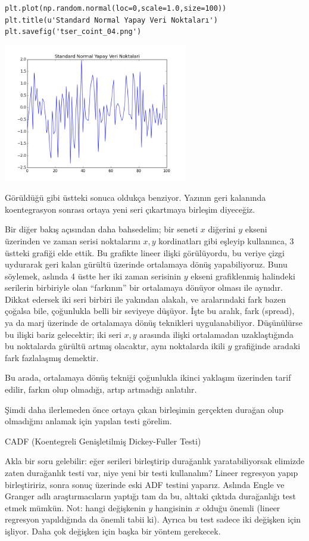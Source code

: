 \documentclass[12pt,fleqn]{article}\usepackage{../../common}
\begin{document}
\begin{verbatim}
plt.plot(np.random.normal(loc=0,scale=1.0,size=100))
plt.title(u'Standard Normal Yapay Veri Noktaları')
plt.savefig('tser_coint_04.png')
\end{verbatim}

\includegraphics[height=6cm]{tser_coint_04.png}

Görüldüğü gibi üstteki sonuca oldukça benziyor. Yazının geri kalanında
koentegrasyon sonrası ortaya yeni seri çıkartmaya birleşim diyeceğiz.

Bir diğer bakış açısından daha bahsedelim; bir seneti $x$ diğerini $y$
ekseni üzerinden ve zaman serisi noktalarını $x,y$ kordinatları gibi
eşleyip kullanınca, 3 üstteki grafiği elde ettik. Bu grafikte lineer ilişki
görülüyordu, bu veriye çizgi uydurarak geri kalan gürültü üzerinde
ortalamaya dönüş yapabiliyoruz. Bunu söylemek, aslında 4 üstte her iki
zaman serisinin $y$ ekseni grafiklenmiş halindeki serilerin birbiriyle olan
``farkının'' bir ortalamaya dönüyor olması ile aynıdır. Dikkat edersek iki
seri birbiri ile yakından alakalı, ve aralarındaki fark bazen çoğalsa bile,
çoğunlukla belli bir seviyeye düşüyor. İşte bu aralık, fark (spread), ya da
marj üzerinde de ortalamaya dönüş teknikleri uygulanabiliyor. Düşünülürse
bu ilişki bariz gelecektir; iki seri $x,y$ arasında ilişki ortalamadan
uzaklaştığında bu noktalarda gürültü artmış olacaktır, aynı noktalarda
ikili $y$ grafiğinde aradaki fark fazlalaşmış demektir.

Bu arada, ortalamaya dönüş tekniği çoğunlukla ikinci yaklaşım üzerinden tarif
edilir, farkın olup olmadığı, artıp artmadığı anlatılır.

Şimdi daha ilerlemeden önce ortaya çıkan birleşimin gerçekten durağan olup
olmadığını anlamak için yapılan testi görelim.

CADF (Koentegreli Genişletilmiş Dickey-Fuller Testi)

Akla bir soru gelebilir: eğer serileri birleştirip durağanlık
yaratabiliyorsak elimizde zaten durağanlık testi var, niye yeni bir testi
kullanalım? Lineer regresyon yapıp birleştiririz, sonra sonuç üzerinde eski
ADF testini yaparız. Aslında Engle ve Granger adlı araştırmacıların 
yaptığı tam da bu, alttaki çıktıda durağanlığı test etmek mümkün. Not:
hangi değişkenin $y$ hangisinin $x$ olduğu önemli (lineer regresyon
yapıldığında da önemli tabii ki). Ayrıca bu test sadece iki değişken için
işliyor. Daha çok değişken için başka bir yöntem gerekecek.
\end{document}
